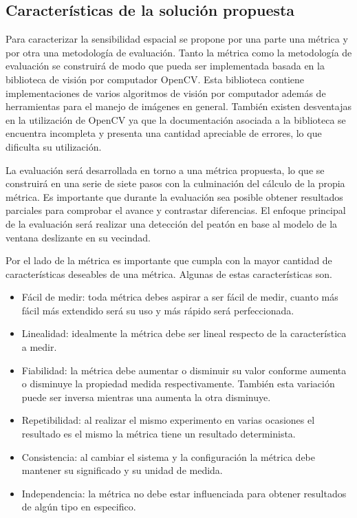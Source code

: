 \subsection{Características de la solución propuesta}

Para caracterizar la sensibilidad espacial se propone por una parte una métrica y por otra una metodología de evaluación. Tanto la métrica como la metodología de evaluación se construirá de modo que pueda ser implementada basada en la biblioteca de visión por computador OpenCV. Esta biblioteca contiene implementaciones de varios algoritmos de visión por computador además de herramientas para el manejo de imágenes en general. También existen desventajas en la utilización de OpenCV ya que la documentación asociada a la biblioteca se encuentra incompleta y presenta una cantidad apreciable de errores, lo que dificulta su utilización.

La evaluación será desarrollada en torno a una métrica propuesta, lo que se construirá en una serie de siete pasos con la culminación del cálculo de la propia métrica. Es importante que durante la evaluación sea posible obtener resultados parciales para comprobar el avance y contrastar diferencias. El enfoque principal de la evaluación será realizar una detección del peatón en base al modelo de la ventana deslizante en su vecindad. 

Por el lado de la métrica es importante que cumpla con la mayor cantidad de características deseables de una métrica. Algunas de estas características son.


\begin{itemize}
\item Fácil de medir: toda métrica debes aspirar a ser fácil de medir, cuanto más fácil más extendido será su uso y más rápido será perfeccionada.
\item Linealidad: idealmente la métrica debe ser lineal respecto de la característica a medir.
\item Fiabilidad: la métrica debe aumentar o disminuir su valor conforme aumenta o disminuye la propiedad medida respectivamente. También esta variación puede ser inversa \ie mientras una aumenta la otra disminuye.
\item Repetibilidad: al realizar el mismo experimento en varias ocasiones el resultado es el mismo \ie la métrica tiene un resultado determinista.
\item Consistencia: al cambiar el sistema y la configuración la métrica debe mantener su significado y su unidad de medida.
\item Independencia: la métrica no debe estar influenciada para obtener resultados de algún tipo en especifico.
\end{itemize}

